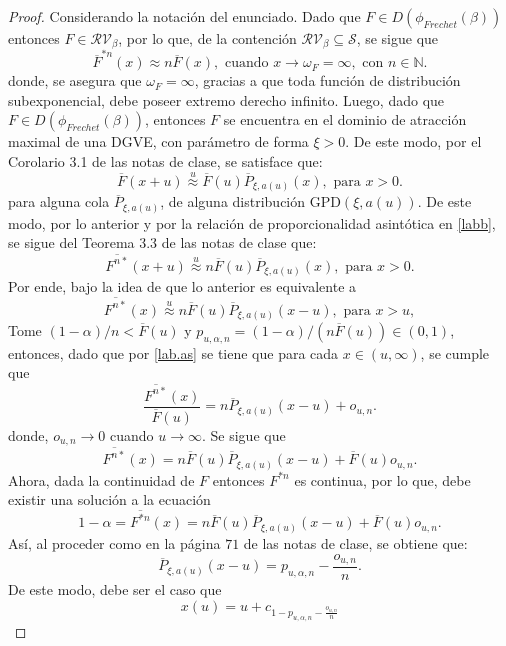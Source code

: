\documentclass[10.5pt,notitlepage]{article}
\newcommand{\NN}{\mathbb{N}}
\newcommand{\Ss}{\mathcal{S}}
\newcommand{\approxu}{\overset{u}{\approx}}
\theoremstyle{plain}
\begin{document}
\begin{proof}
Considerando la notación del enunciado. Dado que \(F\in D(\phi_{Frechet}(\beta))\) entonces \(F \in \mathcal{RV}_{\beta}\), por lo que, de la contención \(\mathcal{RV}_{\beta} \subseteq \Ss\), se sigue que 
\begin{equation}\label{labb}
\overline{F}^{*n}(x) \approx n\overline{F}(x), \text{ cuando } x \to \omega_{F} = \infty, \text{ con } n \in\NN.    
\end{equation}
donde, se asegura que \(\omega_{F} = \infty\), gracias a que toda función de distribución subexponencial, debe poseer extremo derecho infinito. Luego, dado que \(F\in D(\phi_{Frechet}(\beta))\), entonces \(F\) se encuentra en el dominio de atracción maximal de una DGVE, con parámetro de forma \(\xi >0\). De este modo, por el Corolario 3.1 de las notas de clase, se satisface que:
\[
\overline{F}(x + u )\approxu \overline{F}(u)\overline{P}_{\xi, a(u)}(x), \text{ para } x > 0. 
\]
para alguna cola \(\overline{P}_{\xi, a(u)}\), de alguna distribución GPD\((\xi,a(u))\). De este modo, por lo anterior y por la relación de proporcionalidad asintótica en \eqref{labb}, se sigue del Teorema 3.3 de las notas de clase que: 
\[
\overline{F^{n*}}(x + u )\approxu n\overline{F}(u)\overline{P}_{\xi, a(u)}(x), \text{ para } x > 0. 
\]
Por ende, bajo la idea de que lo anterior es equivalente a 
\begin{equation}\label{lab.as}
\overline{F^{n*}}(x)\approxu n\overline{F}(u)\overline{P}_{\xi, a(u)}(x - u), \text{ para } x > u,     
\end{equation}
Tome \((1-\alpha)/n < \overline{F}(u)\) y \(p_{u,\alpha,n} = (1- \alpha)/(n \overline{F}(u)) \in (0,1)\), entonces, dado que por \eqref{lab.as} se tiene que para cada \(x\in(u,\infty)\), se cumple que
\[
\frac{\overline{F^{n*}}(x )}{\overline{F}(u)} =  n\overline{P}_{\xi, a(u)}(x - u) + o_{u,n}.
\]
donde, \(o_{u,n} \to 0\) cuando \(u \to \infty\).  Se sigue que
\[
\overline{F^{n*}}(x) = n\overline{F}(u)\overline{P}_{\xi, a(u)}(x - u)  + \overline{F}(u)o_{u,n}. 
\]
Ahora, dada la continuidad de \(F\) entonces \(F^{*n}\) es continua, por lo que, debe existir una solución a la ecuación
\[
1 - \alpha =\overline{F^{*n}}(x) = n\overline{F}(u)\overline{P}_{\xi, a(u)}(x - u)  + \overline{F}(u)o_{u,n}. 
\]
Así, al proceder como en la página \(71\) de las notas de clase, se obtiene que:
\[
\overline{P}_{\xi, a(u)}(x - u)  = p_{u,\alpha,n} - \frac{o_{u,n}}{n}. 
\]
De este modo, debe ser el caso que
\begin{equation}\label{lab.1111}
x(u) = u + c_{1 - p_{u,\alpha,n} - \frac{o_{u,n}}{n}}    

\end{equation}
\end{proof}
\end{document}
